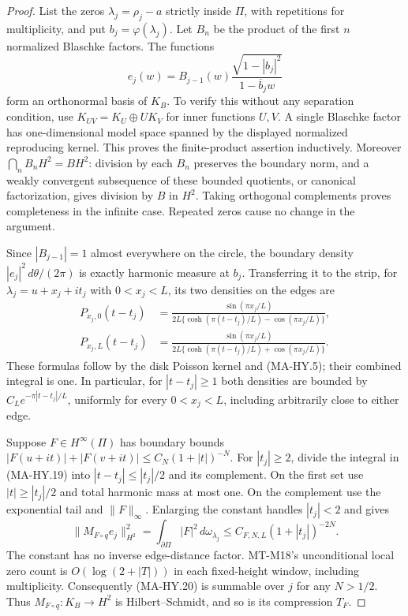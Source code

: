 \begin{proof}
List the zeros $\lambda_j=\rho_j-a$ strictly inside $\Pi$,
with repetitions for multiplicity, and put $b_j=\varphi(\lambda_j)$.
Let $B_n$ be the product of the first $n$ normalized Blaschke
factors.  The functions
\[
       e_j(w)=B_{j-1}(w)
               \frac{\sqrt{1-|b_j|^2}}{1-\overline b_j w}
 \tag{MA-HY.18}
\]
form an orthonormal basis of $K_B$.  To verify this without
any separation condition, use
$K_{UV}=K_U\oplus U K_V$ for inner functions $U,V$.
A single Blaschke factor has one-dimensional model space
spanned by the displayed normalized reproducing kernel.
This proves the finite-product assertion inductively.
Moreover $\bigcap_nB_nH^2=BH^2$: division by each $B_n$
preserves the boundary norm, and a weakly convergent
subsequence of these bounded quotients, or canonical
factorization, gives division by $B$ in $H^2$.
Taking orthogonal complements proves completeness in the
infinite case.  Repeated zeros cause no change in the argument.

Since $|B_{j-1}|=1$ almost everywhere on the circle,
the boundary density $|e_j|^2\,d\theta/(2\pi)$ is exactly
harmonic measure at $b_j$.  Transferring it to the strip,
for $\lambda_j=u+x_j+it_j$ with $0<x_j<L$, its two
densities on the edges are
\[
 \begin{aligned}
 P_{x_j,0}(t-t_j)&=
  \frac{\sin(\pi x_j/L)}
       {2L\{\cosh(\pi(t-t_j)/L)-\cos(\pi x_j/L)\}},\\
 P_{x_j,L}(t-t_j)&=
  \frac{\sin(\pi x_j/L)}
       {2L\{\cosh(\pi(t-t_j)/L)+\cos(\pi x_j/L)\}}.
 \end{aligned}
 \tag{MA-HY.19}
\]
These formulas follow by the disk Poisson kernel and
(MA-HY.5); their combined integral is one.  In particular,
for $|t-t_j|\ge1$ both densities are bounded by
$C_L e^{-\pi|t-t_j|/L}$, uniformly for every
$0<x_j<L$, including arbitrarily close to either edge.

Suppose $F\in H^\infty(\Pi)$ has boundary bounds
$|F(u+it)|+|F(v+it)|\le C_N(1+|t|)^{-N}$.
For $|t_j|\ge2$, divide the integral in (MA-HY.19) into
$|t-t_j|\le |t_j|/2$ and its complement.  On the first
set use $|t|\ge|t_j|/2$ and total harmonic mass at most
one.  On the complement use the exponential tail and
$\|F\|_\infty$.  Enlarging the constant handles
$|t_j|<2$ and gives
\[
 \|M_{F\circ q}e_j\|_{H^2}^2
       =\int_{\partial\Pi}|F|^2\,d\omega_{\lambda_j}
       \le C_{F,N,L}(1+|t_j|)^{-2N}.
 \tag{MA-HY.20}
\]
The constant has no inverse edge-distance factor.
MT-M18's unconditional local zero count is
$O(\log(2+|T|))$ in each fixed-height window, including
multiplicity.  Consequently (MA-HY.20) is summable
over $j$ for any $N>1/2$.  Thus
$M_{F\circ q}:K_B\to H^2$ is Hilbert--Schmidt, and so
is its compression $T_F$.


\end{proof}
